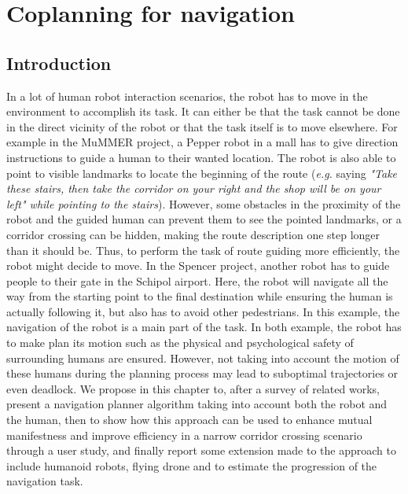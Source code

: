 \documentclass[a4paper,11pt,twoside]{StyleThese}
\begin{document}
\setcounter{chapter}{1} %
\dominitoc
\faketableofcontents
\fi

\chapter{Coplanning for navigation}
\minitoc

\section{Introduction}
In a lot of human robot interaction scenarios, the robot has to move in the environment to accomplish its task. It can either be that the task cannot be done in the direct vicinity of the robot or that the task itself is to move elsewhere. For example in the MuMMER project, a Pepper robot in a mall has to give direction instructions to guide a human to their wanted location. The robot is also able to point to visible landmarks to locate the beginning of the route (\textit{e.g.} saying \textit{"Take these stairs, then take the corridor on your right and the shop will be on your left" while pointing to the stairs}). However, some obstacles in the proximity of the robot and the guided human can prevent them to see the pointed landmarks, or a corridor crossing can be hidden, making the route description one step longer than it should be. Thus, to perform the task of route guiding more efficiently, the robot might decide to move.
In the Spencer project, another robot has to guide people to their gate in the Schipol airport. Here, the robot will navigate all the way from the starting point to the final destination while ensuring the human is actually following it, but also has to avoid other pedestrians. In this example, the navigation of the robot is a main part of the task.
In both example, the robot has to make plan its motion such as the physical and psychological safety of surrounding humans are ensured. However, not taking into account the motion of these humans during the planning process may lead to suboptimal trajectories or even deadlock.
We propose in this chapter to, after a survey of related works, present a navigation planner algorithm taking into account both the robot and the human, then to show how this approach can be used to enhance mutual manifestness and improve efficiency in a narrow corridor crossing scenario through a user study, and finally report some extension made to the approach to include humanoid robots, flying drone and to estimate the progression of the navigation task. 
\end{document}
